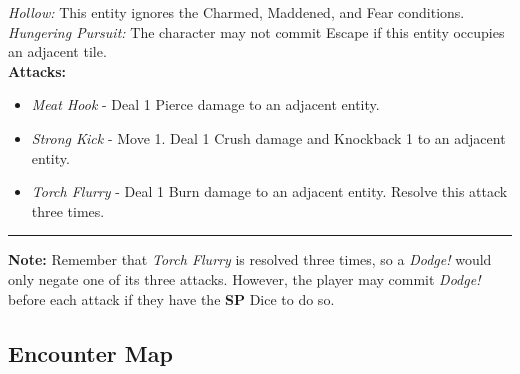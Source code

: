\emph{Hollow:} This entity ignores the Charmed, Maddened, and Fear conditions.\\

\emph{Hungering Pursuit:} The character may not commit Escape if this entity occupies an adjacent tile.\\

\textbf{Attacks:}
\begin{itemize}
\item \emph{Meat Hook} - Deal 1 Pierce damage to an adjacent entity.
\item \emph{Strong Kick} - Move 1. Deal 1 Crush damage and Knockback 1 to an adjacent entity.
\item \emph{Torch Flurry} - Deal 1 Burn damage to an adjacent entity. Resolve this attack three times.
\end{itemize}
\hrule

\begin{tcolorbox}
\textbf{Note:} Remember that \emph{Torch Flurry} is resolved three times, so a \emph{Dodge!} would only negate one of its three attacks. However, the player may commit \emph{Dodge!} before each attack if they have the \textbf{SP} Dice to do so.
\end{tcolorbox}

\subsection*{Encounter Map}

\begin{center}
\end{center}

